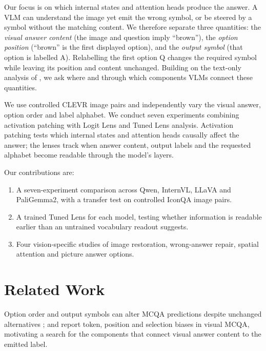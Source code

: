 \documentclass[11pt]{article}
\begin{document}
Our focus is on which internal states and attention heads produce the answer. A VLM can understand the image yet emit the wrong symbol, or be steered by a symbol without the matching content. We therefore separate three quantities: the \emph{visual answer content} (the image and question imply ``brown''), the \emph{option position} (``brown'' is the first displayed option), and the \emph{output symbol} (that option is labelled A). Relabelling the first option Q changes the required symbol while leaving its position and content unchanged. Building on the text-only analysis of \citet{wiegreffe2025answerassembleaceunderstanding}, we ask where and through which components VLMs connect these quantities.

We use controlled CLEVR image pairs and independently vary the visual answer, option order and label alphabet. We conduct seven experiments combining activation patching with Logit Lens and Tuned Lens analysis. Activation patching tests which internal states and attention heads causally affect the answer; the lenses track when answer content, output labels and the requested alphabet become readable through the model's layers.

Our contributions are:
\begin{enumerate}
\item A seven-experiment comparison across Qwen, InternVL, LLaVA and PaliGemma2, with a transfer test on controlled IconQA image pairs.
\item A trained Tuned Lens for each model, testing whether information is readable earlier than an untrained vocabulary readout suggests.
\item Four vision-specific studies of image restoration, wrong-answer repair, spatial attention and picture answer options.
\end{enumerate}

\section{Related Work}
\label{sec:related-work}

Option order and output symbols can alter MCQA predictions despite unchanged alternatives \citep{zheng2024large}; \citet{atabuzzaman2025benchmarking} and \citet{zeno2025choosing} report token, position and selection biases in visual MCQA, motivating a search for the components that connect visual answer content to the emitted label.
\end{document}
